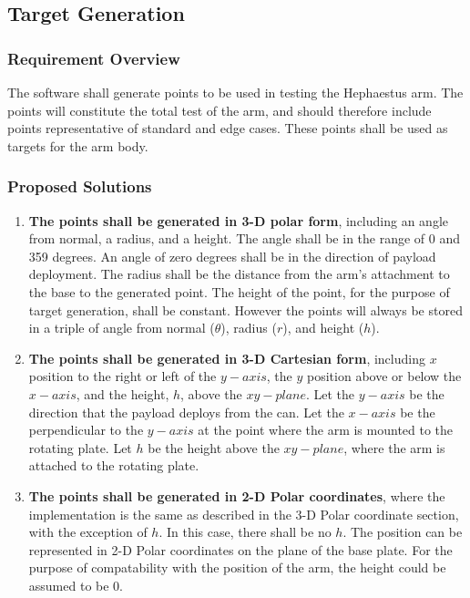 \documentclass[letterpaper,10pt]{article}
\begin{document}
\subsection{Target Generation}
\subsubsection{Requirement Overview}
The software shall generate points to be used in testing the Hephaestus arm.
The points will constitute the total test of the arm, and should therefore include points
representative of standard and edge cases.
These points shall be used as targets for the arm body.
\subsubsection{Proposed Solutions}
\begin{enumerate}
\item{
\textbf{The points shall be generated in 3-D polar form}, including an angle from normal, a radius, 
and a height. 
The angle shall be in the range of 0 and 359 degrees.
An angle of zero degrees shall be in the direction of payload deployment.
The radius shall be the distance from the arm's attachment to the base to the generated point.
The height of the point, for the purpose of target generation, shall be constant.
However the points will always be stored in a triple of angle from normal (\(\theta\)), radius (\(r\)), and height (\(h\)).
}
\item{
\textbf{The points shall be generated in 3-D Cartesian form}, including \(x\) position to the right 
or left of the \(y-axis\), the \(y\) position above or below the \(x-axis\), and the height, \(h\), 
above the \(xy-plane\).
Let the \(y-axis\) be the direction that the payload deploys from the can.
Let the \(x-axis\) be the perpendicular to the \(y-axis\) at the point where the arm is mounted 
to the rotating plate. 
Let \(h\) be the height above the \(xy-plane\), where the arm is attached to the rotating plate.
}
\item{
\textbf{The points shall be generated in 2-D Polar coordinates}, where the implementation is the 
same as described in the 3-D Polar coordinate section, with the exception of \(h\).
In this case, there shall be no \(h\).
The position can be represented in 2-D Polar coordinates on the plane of the base plate.
For the purpose of compatability with the position of the arm, the height could be assumed to be 0.
}
\end{enumerate}
\end{document}
